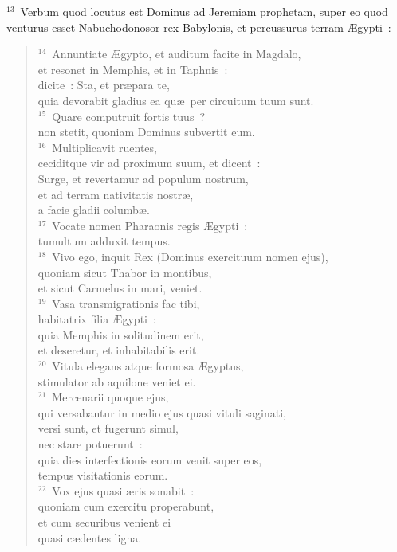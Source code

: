 ${}^{13}$~Verbum quod locutus est Dominus ad Jeremiam prophetam, super eo quod venturus esset Nabuchodonosor rex Babylonis, et percussurus terram \AE gypti~:
\begin{verse}${}^{14}$~Annuntiate \AE gypto, et auditum facite in Magdalo,\\ et resonet in Memphis, et in Taphnis~:\\ dicite~: Sta, et pr\ae para te,\\ quia devorabit gladius ea qu\ae\ per circuitum tuum sunt.\\
${}^{15}$~Quare computruit fortis tuus~?\\ non stetit, quoniam Dominus subvertit eum.\\
${}^{16}$~Multiplicavit ruentes,\\ ceciditque vir ad proximum suum, et dicent~:\\ Surge, et revertamur ad populum nostrum,\\ et ad terram nativitatis nostr\ae ,\\ a facie gladii columb\ae .\\
${}^{17}$~Vocate nomen Pharaonis regis \AE gypti~:\\ tumultum adduxit tempus.\\
${}^{18}$~Vivo ego, inquit Rex (Dominus exercituum nomen ejus),\\ quoniam sicut Thabor in montibus,\\ et sicut Carmelus in mari, veniet.\\
${}^{19}$~Vasa transmigrationis fac tibi,\\ habitatrix filia \AE gypti~:\\ quia Memphis in solitudinem erit,\\ et deseretur, et inhabitabilis erit.\\
${}^{20}$~Vitula elegans atque formosa \AE gyptus,\\ stimulator ab aquilone veniet ei.\\
${}^{21}$~Mercenarii quoque ejus,\\ qui versabantur in medio ejus quasi vituli saginati,\\ versi sunt, et fugerunt simul,\\ nec stare potuerunt~:\\ quia dies interfectionis eorum venit super eos,\\ tempus visitationis eorum.\\
${}^{22}$~Vox ejus quasi \ae ris sonabit~:\\ quoniam cum exercitu properabunt,\\ et cum securibus venient ei\\ quasi c\ae dentes ligna.\\

\end{verse}
